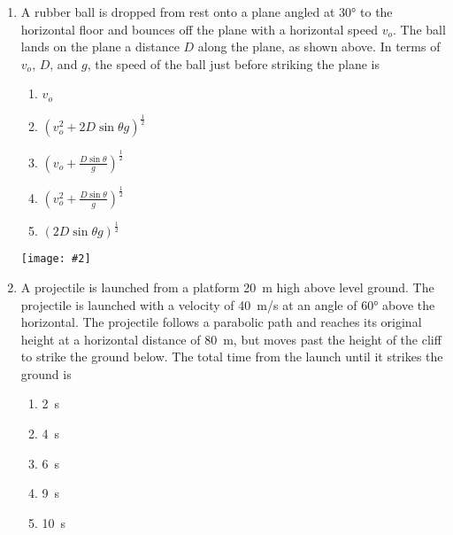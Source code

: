 \documentclass[12pt]{article}
\newcommand{\pic}[2]{\texttt{[image: \#2]}}
\begin{document}
\begin{enumerate}[leftmargin=50pt,label=\underline{\hspace{0.4in}} \arabic*.]
  \vspace{-0.5in}\begin{center}
    \pic{0.3}{bounce.png}
  \end{center}
  
\item\vspace{-.2in} A rubber ball is dropped from rest onto a plane angled at \ang{30} to the
  horizontal floor and bounces off the plane with a horizontal speed $v_o$.
  The ball lands on the plane a distance $D$ along the plane, as shown above.
  In terms of $v_o$, $D$, and $g$, the speed of the ball just before striking
  the plane is
  \begin{enumerate}[noitemsep,topsep=0pt]
  \item $v_o$
  \item $\displaystyle\left(v_o^2+2D\sin\theta g\right)^\frac{1}{2}$
  \item $\displaystyle\left(v_o+\frac{D\sin\theta}{g}\right)^\frac{1}{2}$
  \item $\displaystyle\left(v_o^2+\frac{D\sin\theta}{g}\right)^\frac{1}{2}$
  \item $\displaystyle\left(2D\sin\theta g\right)^\frac{1}{2}$
  \end{enumerate}

  \vspace{-.2in}\begin{center}
    \pic{.55}{projectile2.png}
  \end{center}

\item\vspace{-.2in} A projectile is launched from a platform \SI{20}{m} high above level
  ground. The projectile is launched with a velocity of \SI{40}{m/s} at an
  angle of \ang{60} above the horizontal. The projectile follows a parabolic
  path and reaches its original height at a horizontal distance of \SI{80}{m},
  but moves past the height of the cliff to strike the ground below. The total
  time from the launch until it strikes the ground is
  \begin{enumerate}[noitemsep,topsep=0pt]
  \item\SI{2}{\second}
  \item\SI{4}{\second}
  \item\SI{6}{\second}
  \item\SI{9}{\second}
  \item\SI{10}{\second}
  \end{enumerate}


\end{enumerate}
\end{document}
